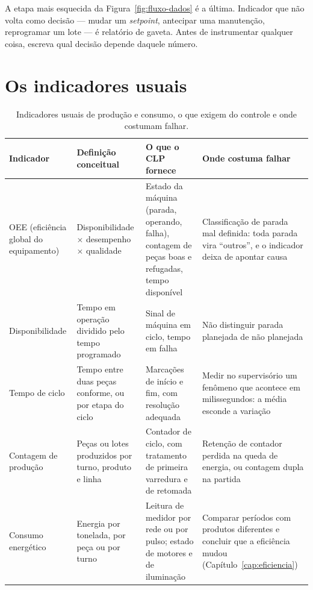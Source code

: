 \begin{atencao}
A etapa mais esquecida da Figura~\ref{fig:fluxo-dados} é a última. Indicador que não volta como
decisão --- mudar um \emph{setpoint}, antecipar uma manutenção, reprogramar um lote --- é relatório
de gaveta. Antes de instrumentar qualquer coisa, escreva qual decisão depende daquele número.
\end{atencao}


\section{Os indicadores usuais}

\begin{table}[H]
  \centering
  \caption{Indicadores usuais de produção e consumo, o que exigem do controle e onde costumam falhar.}
  \label{tab:indicadores}
  \begin{tabular}{p{3.0cm} p{4.1cm} p{3.4cm} p{3.8cm}}
    \toprule
    Indicador & Definição conceitual & O que o CLP fornece & Onde costuma falhar \\
    \midrule
    OEE (eficiência global do equipamento)
      & Disponibilidade $\times$ desempenho $\times$ qualidade
      & Estado da máquina (parada, operando, falha), contagem de peças boas e refugadas, tempo
        disponível
      & Classificação de parada mal definida: toda parada vira ``outros'', e o indicador deixa de
        apontar causa \\
    \addlinespace
    Disponibilidade
      & Tempo em operação dividido pelo tempo programado
      & Sinal de máquina em ciclo, tempo em falha
      & Não distinguir parada planejada de não planejada \\
    \addlinespace
    Tempo de ciclo
      & Tempo entre duas peças conforme, ou por etapa do ciclo
      & Marcações de início e fim, com resolução adequada
      & Medir no supervisório um fenômeno que acontece em milissegundos: a média esconde a variação \\
    \addlinespace
    Contagem de produção
      & Peças ou lotes produzidos por turno, produto e linha
      & Contador de ciclo, com tratamento de primeira varredura e de retomada
      & Retenção de contador perdida na queda de energia, ou contagem dupla na partida \\
    \addlinespace
    Consumo energético
      & Energia por tonelada, por peça ou por turno
      & Leitura de medidor por rede ou por pulso; estado de motores e de iluminação
      & Comparar períodos com produtos diferentes e concluir que a eficiência mudou
        (Capítulo~\ref{cap:eficiencia}) \\
    \bottomrule
  \end{tabular}
\end{table}

